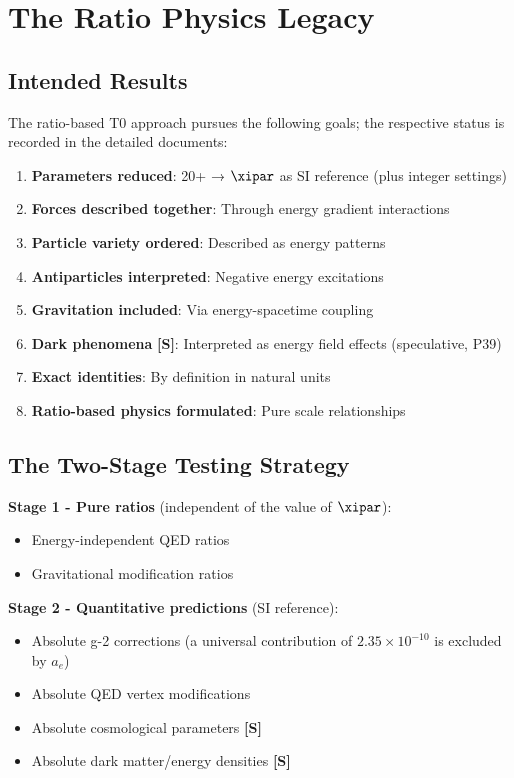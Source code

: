 	\section{The Ratio Physics Legacy}
	
	\subsection{Intended Results}
	
	The ratio-based T0 approach pursues the following goals; the respective status is recorded in the detailed documents:
	
	\begin{enumerate}
		\item \textbf{Parameters reduced}: 20+ → $\xipar$ as SI reference (plus integer settings)
		\item \textbf{Forces described together}: Through energy gradient interactions
		\item \textbf{Particle variety ordered}: Described as energy patterns
		\item \textbf{Antiparticles interpreted}: Negative energy excitations
		\item \textbf{Gravitation included}: Via energy-spacetime coupling
		\item \textbf{Dark phenomena} \textbf{[S]}: Interpreted as energy field effects (speculative, P39)
		\item \textbf{Exact identities}: By definition in natural units
		\item \textbf{Ratio-based physics formulated}: Pure scale relationships
	\end{enumerate}
	
	\subsection{The Two-Stage Testing Strategy}
	
	\textbf{Stage 1 - Pure ratios} (independent of the value of $\xipar$):
	\begin{itemize}
		\item Energy-independent QED ratios
		\item Gravitational modification ratios
	\end{itemize}
	
	\textbf{Stage 2 - Quantitative predictions} (SI reference):
	\begin{itemize}
		\item Absolute g-2 corrections (a universal contribution of $2.35\times10^{-10}$ is excluded by $a_e$)
		\item Absolute QED vertex modifications
		\item Absolute cosmological parameters \textbf{[S]}
		\item Absolute dark matter/energy densities \textbf{[S]}
	\end{itemize}
	
